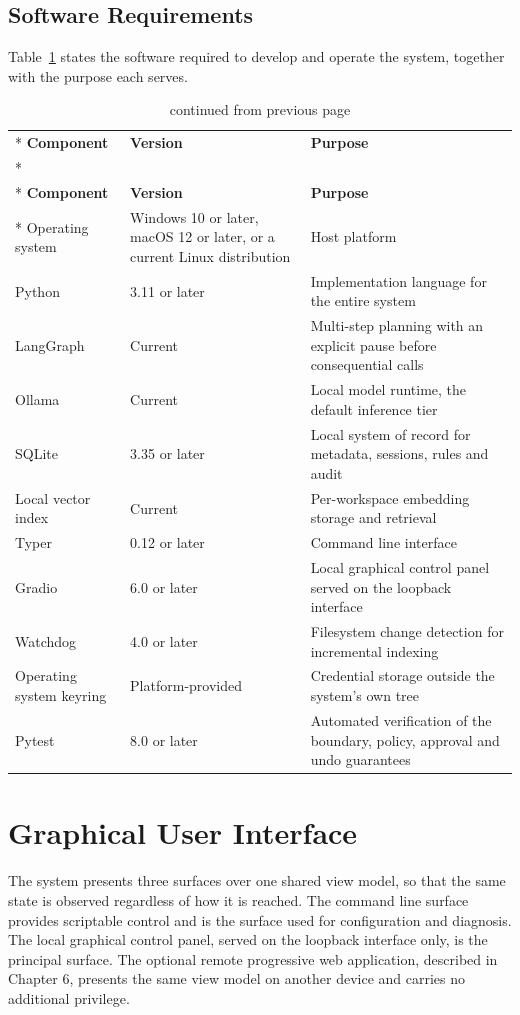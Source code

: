 \documentclass{FastFyp}
\begin{document}
\subsection{Software Requirements}
Table~\ref{tab:software} states the software required to develop and operate the system, together with the purpose each serves.

{
\begin{longtable}{|p{3.6cm}|p{3.0cm}|p{6.2cm}|}
\caption{Software requirements.}\label{tab:software}\\*
\hline
\textbf{Component} & \textbf{Version} & \textbf{Purpose} \\*
\hline
\endfirsthead
\caption[]{continued from previous page}\\*
\hline
\textbf{Component} & \textbf{Version} & \textbf{Purpose} \\*
\hline
\endhead
\hline
Operating system & Windows 10 or later, macOS 12 or later, or a current Linux distribution & Host platform \\
\hline
Python & 3.11 or later & Implementation language for the entire system \\
\hline
LangGraph \cite{ref:langgraph} & Current & Multi-step planning with an explicit pause before consequential calls \\
\hline
Ollama \cite{ref:ollama} & Current & Local model runtime, the default inference tier \\
\hline
SQLite \cite{ref:sqlite} & 3.35 or later & Local system of record for metadata, sessions, rules and audit \\
\hline
Local vector index & Current & Per-workspace embedding storage and retrieval \\
\hline
Typer & 0.12 or later & Command line interface \\
\hline
Gradio & 6.0 or later & Local graphical control panel served on the loopback interface \\
\hline
Watchdog & 4.0 or later & Filesystem change detection for incremental indexing \\
\hline
Operating system keyring & Platform-provided & Credential storage outside the system's own tree \\
\hline
Pytest & 8.0 or later & Automated verification of the boundary, policy, approval and undo guarantees \\
\hline
\end{longtable}
}

\section{Graphical User Interface}
The system presents three surfaces over one shared view model, so that the same state is observed regardless of how it is reached. The command line surface provides scriptable control and is the surface used for configuration and diagnosis. The local graphical control panel, served on the loopback interface only, is the principal surface. The optional remote progressive web application, described in Chapter 6, presents the same view model on another device and carries no additional privilege.
\end{document}
